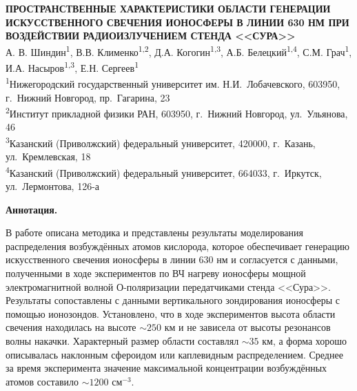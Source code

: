 \documentclass[12pt,a4paper]{article}
\begin{document}

\begin{center}
	{\large\bf ПРОСТРАНСТВЕННЫЕ ХАРАКТЕРИСТИКИ ОБЛАСТИ ГЕНЕРАЦИИ ИСКУССТВЕННОГО СВЕЧЕНИЯ ИОНОСФЕРЫ В ЛИНИИ 630 НМ ПРИ ВОЗДЕЙСТВИИ РАДИОИЗЛУЧЕНИЕМ СТЕНДА <<СУРА>>}\\
	\vskip 0.5cm
	А. В. Шиндин\textsuperscript{1}, В.В. Клименко\textsuperscript{1,2}, Д.А. Когогин\textsuperscript{1,3}, А.Б. Белецкий\textsuperscript{1,4}, С.М. Грач\textsuperscript{1}, И.А. Насыров\textsuperscript{1,3}, Е.Н. Сергеев\textsuperscript{1}\\
	\vskip 0.5cm
	\textsuperscript{1}Нижегородский государственный университет им. Н.И.~Лобачевского,
	603950, г.~Нижний Новгород, пр.~Гагарина, 23\\
	\textsuperscript{2}Институт прикладной физики РАН,
	603950, г.~Нижний Новгород, ул.~Ульянова, 46\\
	\textsuperscript{3}Казанский (Приволжский) федеральный университет,
	420000, г.~Казань, ул.~Кремлевская, 18\\
	\textsuperscript{4}Казанский (Приволжский) федеральный университет,
	664033, г.~Иркутск, ул.~Лермонтова, 126-а\\
\end{center}
\thispagestyle{empty}
\textbf{Аннотация.}
 
В работе описана методика и представлены результаты моделирования распределения 
возбуждённых атомов кислорода, которое обеспечивает генерацию искусственного 
свечения ионосферы в линии 630 нм и согласуется с данными, полученными в ходе 
экспериментов по ВЧ нагреву ионосферы мощной электромагнитной волной 
О-поляризации передатчиками стенда <<Сура>>. Результаты сопоставлены с данными 
вертикального зондирования ионосферы с помощью ионозондов. Установлено, что в 
ходе экспериментов высота области свечения находилась на высоте $\sim250$ км 
и не зависела от высоты резонансов волны накачки. Характерный размер области 
составлял  $\sim35$ км, а форма хорошо описывалась наклонным сфероидом или 
каплевидным распределением. Среднее за время эксперимента значение максимальной 
концентрации возбуждённых атомов составило $\sim1200$ см$^{-3}$.\\
\end{document}
